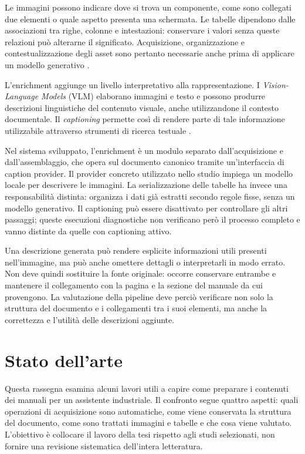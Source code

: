 Le immagini possono indicare dove si trova un componente, come sono collegati due elementi o quale aspetto presenta una schermata. Le tabelle dipendono dalle associazioni tra righe, colonne e intestazioni: conservare i valori senza queste relazioni può alterarne il significato. Acquisizione, organizzazione e contestualizzazione degli asset sono pertanto necessarie anche prima di applicare un modello generativo \parencite{auer2024docling,charan2026fmea}.

L'enrichment aggiunge un livello interpretativo alla rappresentazione. I \emph{Vision-Language Models} (VLM) elaborano immagini e testo e possono produrre descrizioni linguistiche del contenuto visuale, anche utilizzandone il contesto documentale. Il \emph{captioning} permette così di rendere parte di tale informazione utilizzabile attraverso strumenti di ricerca testuale \parencite{riedler2024beyond}.

Nel sistema sviluppato, l'enrichment è un modulo separato dall'acquisizione e dall'assemblaggio, che opera sul documento canonico tramite un'interfaccia di caption provider. Il provider concreto utilizzato nello studio impiega un modello locale per descrivere le immagini. La serializzazione delle tabelle ha invece una responsabilità distinta: organizza i dati già estratti secondo regole fisse, senza un modello generativo. Il captioning può essere disattivato per controllare gli altri passaggi; queste esecuzioni diagnostiche non verificano però il processo completo e vanno distinte da quelle con captioning attivo.

Una descrizione generata può rendere esplicite informazioni utili presenti nell'immagine, ma può anche omettere dettagli o interpretarli in modo errato. Non deve quindi sostituire la fonte originale: occorre conservare entrambe e mantenere il collegamento con la pagina e la sezione del manuale da cui provengono. La valutazione della pipeline deve perciò verificare non solo la struttura del documento e i collegamenti tra i suoi elementi, ma anche la correttezza e l'utilità delle descrizioni aggiunte.

\section{Stato dell'arte}
\label{sec:stato-arte}

Questa rassegna esamina alcuni lavori utili a capire come preparare i contenuti dei manuali per un assistente industriale. Il confronto segue quattro aspetti: quali operazioni di acquisizione sono automatiche, come viene conservata la struttura del documento, come sono trattati immagini e tabelle e che cosa viene valutato. L'obiettivo è collocare il lavoro della tesi rispetto agli studi selezionati, non fornire una revisione sistematica dell'intera letteratura.

